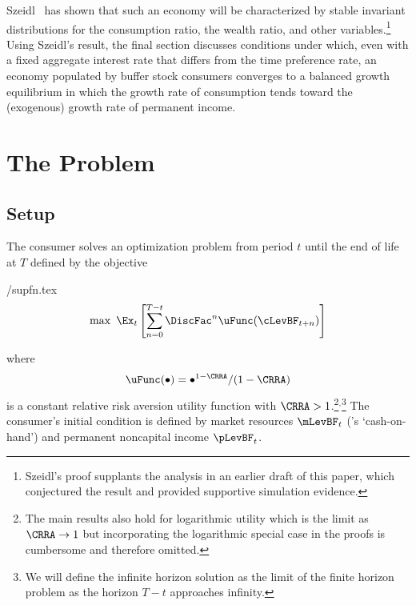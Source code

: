 \documentclass[BufferStockTheory]{subfiles}
\begin{document}
Szeidl~\citeyearpar{szeidlInvariant} has shown that such an economy will be characterized by stable invariant distributions for the consumption ratio, the wealth ratio, and other variables.\footnote{Szeidl's proof supplants the analysis in an earlier draft of this paper, which conjectured the result and provided supportive simulation evidence.}  Using Szeidl's result, the final section discusses conditions under which, even with a fixed aggregate interest rate that differs from the time preference rate, an economy populated by buffer stock consumers converges to a balanced growth equilibrium in which the growth rate of consumption tends toward the (exogenous) growth rate of permanent income.

\hypertarget{The-Problem}{}
\section{The Problem}

\subsection{Setup}
\label{subsec:Setup}

The consumer solves an optimization problem from period
$t$ until the end of life at $T$ defined by the objective
\begin{verbatimwrite}{\EqDir/supfn.tex}
  \begin{align}
    \label{eq:supfn}
    \max~ \Ex_{t}\left[\sum_{n=0}^{T-t} \DiscFac^{n} \uFunc(\cLevBF_{t+n})\right]
  \end{align}
\end{verbatimwrite}

where
\begin{align}
  \uFunc(\bullet)=\bullet^{1-\CRRA}/(1-\CRRA) \label{eq:crrautil}
\end{align}
is a constant relative risk aversion utility function with $\CRRA > 1$.\footnote{The main
  results also hold for logarithmic utility which is the limit as
  $\CRRA \rightarrow 1$ but incorporating the logarithmic special case
  in the proofs is cumbersome and therefore
  omitted.}$^{,}$\footnote{We will define the infinite horizon
  solution as the limit of the finite horizon problem as the horizon
  $T-t$ approaches infinity.}  The consumer's initial condition is
defined by market resources $\mLevBF_{t}$ (\cite{deatonLiqConstr}'s
`cash-on-hand') and permanent noncapital income $\pLevBF_{t}$.
\end{document}

